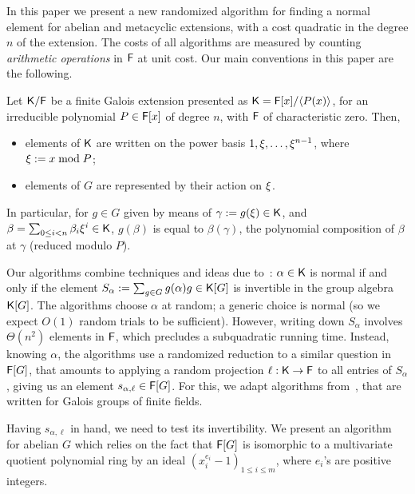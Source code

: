 In this paper we present a new randomized algorithm for finding a normal
element for abelian and metacyclic extensions, with a cost quadratic
in the degree $n$ of the extension. The costs of all algorithms are
measured by counting \emph{arithmetic operations} in ${\mathsf{F}}$ at unit cost.
Our main conventions in this paper are the following.


\begin{assumption}
  \label{assum}
  Let ${\mathsf{K}}/{\mathsf{F}}$ be a finite Galois extension presented as
  ${\mathsf{K}}={\mathsf{F}}[x]/\langle P(x)\rangle$, for an irreducible polynomial $P\in
  {\mathsf{F}}[x]$ of degree $n$, with ${\mathsf{F}}$ of characteristic zero. Then,
  \begin{itemize}
  \item elements of ${\mathsf{K}}$ are written on the power basis $1,\xi,\dots,\xi^{n-1}$,
    where $\xi := x \bmod P$;
  \item elements of $G$ are represented by their action on $\xi$.
  \end{itemize}
\end{assumption}

In particular, for $g \in G$ given by means of $\gamma:=g(\xi) \in {\mathsf{K}}$,
and $\beta = \sum_{0\leq i<n}\beta_i\xi^i\in{\mathsf{K}}$,  $g(\beta)$ is equal to $\beta(\gamma)$, the
polynomial composition of $\beta$ at $\gamma$ (reduced modulo $P$).

Our algorithms combine techniques and ideas due
to~\cite{GatGie90,KalSho98}: $\alpha \in {\mathsf{K}}$ is normal if and only if
the element $S_\alpha := \sum_{g \in G} g(\alpha)g \in {\mathsf{K}}[G]$ is
invertible in the group algebra ${\mathsf{K}}[G]$. The algorithms choose
$\alpha$ at random; a generic choice is normal (so we expect $O(1)$
random trials to be sufficient). However, writing down $S_\alpha$
involves $\Theta(n^2)$ elements in ${\mathsf{F}}$, which precludes a
subquadratic running time. Instead, knowing $\alpha$, the algorithms use a
randomized reduction to a similar question in ${\mathsf{F}}[G]$, that amounts to
applying a random projection $\ell:{\mathsf{K}}\to{\mathsf{F}}$ to all entries of
$S_\alpha$, giving us an element $s_{\alpha,\ell} \in {\mathsf{F}}[G]$. For
this, we adapt algorithms from~\cite{KalSho98}, that are written for
Galois groups of finite fields.

Having $s_{\alpha,\ell}$ in hand, we need to test its
invertibility. We present an algorithm for 
abelian $G$ which relies on the fact that ${\mathsf{F}}[G]$ is isomorphic to a
multivariate quotient polynomial ring by an ideal $(x^{e_i}_i-1)_{1
  \leq i \leq m}$, where $e_i$'s are positive integers. 

